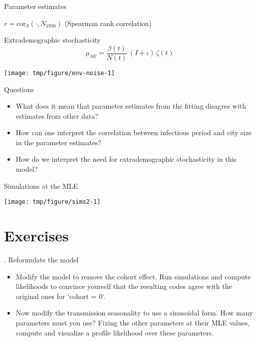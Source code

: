 \begin{frame}[fragile]{Parameter estimates}
\begin{knitrout}
\end{knitrout}

\vspace{1em}
$r=\mathrm{cor}_{S}({\cdot},{N_{1950}})$ (Spearman rank correlation)

\end{frame}

\begin{frame}[fragile]{Extrademographic stochasticity}
  $$\mu_{SE}=\frac{\beta(t)}{N(t)}\,(I+\iota)\,\zeta(t)$$
\begin{knitrout}\small
{}\color{fgcolor}

{\centering \texttt{[image: tmp/figure/env-noise-1]} 

}


\end{knitrout}
\end{frame}

\begin{frame}[fragile]{Questions}
  \begin{itemize}
  \item What does it mean that parameter estimates from the fitting disagree with estimates from other data?
  \item How can one interpret the correlation between infectious period and city size in the parameter estimates?
  \item How do we interpret the need for extrademographic stochasticity in this model?
  \end{itemize}
\end{frame}

\begin{frame}[fragile]{Simulations at the MLE}
\begin{knitrout}\small
{}\color{fgcolor}

{\centering \texttt{[image: tmp/figure/sims2-1]} 

}


\end{knitrout}
\end{frame}

\section{Exercises}

\begin{frame}{\myexercise. Reformulate the model}
  \begin{itemize}
  \item Modify the \citet{He2010} model to remove the cohort effect.
    Run simulations and compute likelihoods to convince yourself that the resulting codes agree with the original ones for `cohort = 0`.
  \item Now modify the transmission seasonality to use a sinusoidal form. How many parameters must you use?
    Fixing the other parameters at their MLE values, compute and visualize a profile likelihood over these parameters.
  \end{itemize}
\end{frame}

